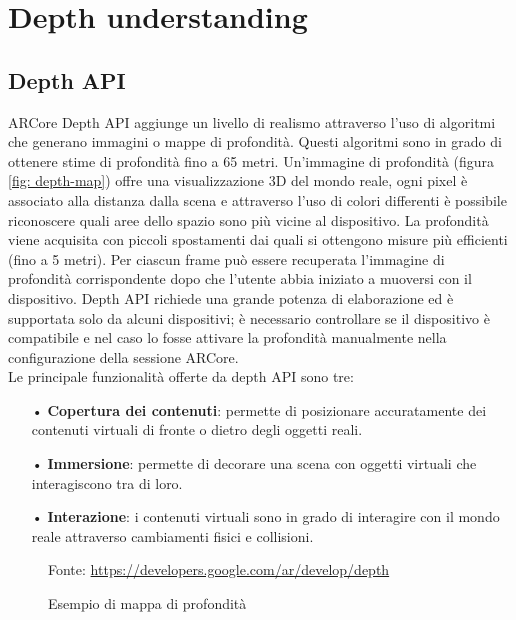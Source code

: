 \documentclass[crop=false, class=book]{standalone}
\begin{document}
		
	\chapter{Depth understanding}
	
		\section{Depth API}
	
			ARCore Depth API aggiunge un livello di realismo attraverso l'uso di algoritmi che generano immagini o mappe di profondità. Questi algoritmi sono in grado di ottenere stime di profondità fino a 65 metri. Un'immagine di profondità (figura \vref{fig: depth-map}) offre una visualizzazione 3D del mondo reale, ogni pixel è associato alla distanza dalla scena e attraverso l'uso di colori differenti è possibile riconoscere quali aree dello spazio sono più vicine al dispositivo. La profondità viene acquisita con piccoli spostamenti dai quali si ottengono misure più efficienti (fino a 5 metri). Per ciascun frame può essere recuperata l'immagine di profondità corrispondente dopo che l'utente abbia iniziato a muoversi con il dispositivo. Depth API richiede una grande potenza di elaborazione ed è supportata solo da alcuni dispositivi; è necessario controllare se il dispositivo è compatibile e nel caso lo fosse attivare la profondità manualmente nella configurazione della sessione ARCore.\\
		 	Le principale funzionalità offerte da depth API sono tre:
		\begin{itemize}
			\item[•] \textbf{Copertura dei contenuti}: permette di posizionare accuratamente dei contenuti virtuali di fronte o dietro degli oggetti reali.
			\item[•] \textbf{Immersione}: permette di decorare una scena con oggetti virtuali che interagiscono tra di loro.
			\item[•] \textbf{Interazione}: i contenuti virtuali sono in grado di interagire con il mondo reale attraverso cambiamenti fisici e collisioni.
		\end{itemize}
		
			\begin{figure}
				\centering
				{Fonte: \url{https://developers.google.com/ar/develop/depth}}
				\caption{Esempio di mappa di profondità}
				\label{fig: depth-map}
			\end{figure}	
		
\end{document}
